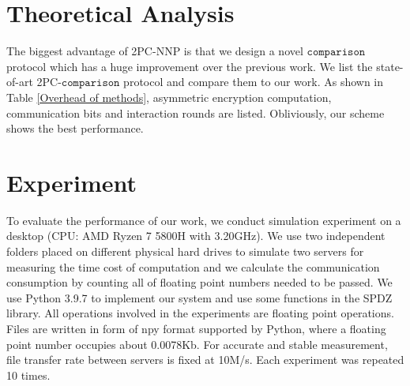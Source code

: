 \documentclass[letterpaper]{article} %
\begin{document}
    \section{Theoretical Analysis}
    \begin{table}[!ht]
    
        \center
        \caption{Overhead of different 2PC-comparison schemes for a $l$-bits value }
        \label{Overhead of methods}
    \end{table}
    The biggest advantage of 2PC-NNP is that we design a novel $\mathtt{comparison}$ protocol which has 
    a huge improvement over the previous work.
    We list the state-of-art 2PC-$\mathtt{comparison}$ protocol and compare them to our work.
    As shown in Table \ref{Overhead of methods}, asymmetric encryption computation, communication bits and 
    interaction rounds are listed.
    Obliviously, our scheme shows the best performance.

    \section{Experiment}
    To evaluate the performance of our work, we conduct simulation experiment on a desktop (CPU: AMD Ryzen 7 5800H with 3.20GHz).
    We use two independent folders placed on different physical hard drives to simulate 
    two servers for measuring the time cost of computation 
    and we calculate the communication consumption by counting all of floating point numbers needed to be passed.
    We use Python 3.9.7 to implement our system and use some functions in the SPDZ library.
    All operations involved in the experiments are floating point operations.
    Files are written in form of npy format supported by Python, where a floating point number occupies about 0.0078Kb.
    For accurate and stable measurement, file transfer rate between servers is fixed at 10M/s.
    Each experiment was repeated 10 times.
\end{document}
